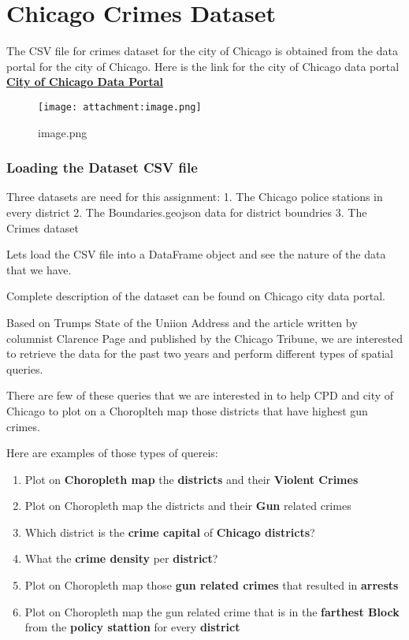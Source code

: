 \documentclass[11pt]{article}
\makeatletter
\def\maxwidth{\ifdim\Gin@nat@width>\linewidth\linewidth
    \else\Gin@nat@width\fi}
\let\Oldincludegraphics\includegraphics
\renewcommand{\includegraphics}[1]{\Oldincludegraphics[width=.8\maxwidth]{#1}}
\providecommand{\tightlist}{%
      \setlength{\itemsep}{0pt}\setlength{\parskip}{0pt}}
\makeatother
\begin{document}
    \hypertarget{chicago-crimes-dataset}{%
\section{Chicago Crimes Dataset}\label{chicago-crimes-dataset}}

The CSV file for crimes dataset for the city of Chicago is obtained from
the data portal for the city of Chicago. Here is the link for the city
of Chicago data portal
\textbf{\href{https://data.cityofchicago.org/Public-Safety/Crimes-2001-to-present/ijzp-q8t2}{City
of Chicago Data Portal}}

\begin{figure}
\centering
\texttt{[image: attachment:image.png]}
\caption{image.png}
\end{figure}

    \hypertarget{loading-the-dataset-csv-file}{%
\subsubsection{Loading the Dataset CSV
file}\label{loading-the-dataset-csv-file}}

Three datasets are need for this assignment: 1. The Chicago police
stations in every district 2. The Boundaries.geojson data for district
boundries 3. The Crimes dataset

Lets load the CSV file into a DataFrame object and see the nature of the
data that we have.

Complete description of the dataset can be found on Chicago city data
portal.

Based on Trumps State of the Uniion Address and the article written by
columnist Clarence Page and published by the Chicago Tribune, we are
interested to retrieve the data for the past two years and perform
different types of spatial queries.

There are few of these queries that we are interested in to help CPD and
city of Chicago to plot on a Choroplteh map those districts that have
highest gun crimes.

Here are examples of those types of quereis:

\begin{enumerate}
\def\labelenumi{\arabic{enumi}.}
\tightlist
\item
  Plot on \textbf{Choropleth map} the \textbf{districts} and their
  \textbf{Violent Crimes}
\item
  Plot on Choropleth map the districts and their \textbf{Gun} related
  crimes
\item
  Which district is the \textbf{crime capital} of \textbf{Chicago
  districts}?
\item
  What the \textbf{crime density} per \textbf{district}?
\item
  Plot on Choropleth map those \textbf{gun related crimes} that resulted
  in \textbf{arrests}
\item
  Plot on Choropleth map the gun related crime that is in the
  \textbf{farthest Block} from the \textbf{policy stattion} for every
  \textbf{district}
\end{enumerate}
\end{document}
